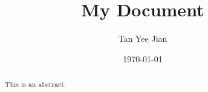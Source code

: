 \documentclass{report}
\author{Tan Yee Jian}
\title{My Document}
\date{\today}
\begin{document}
\maketitle
\begin{abstract}
  This is an abstract.
\end{abstract}
\tableofcontents







\printbibliography
\end{document}

